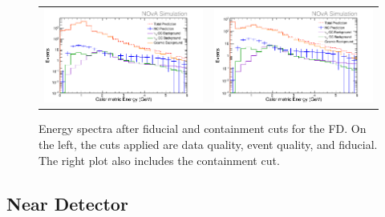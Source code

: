 \begin{figure}[htb]
  \centering
  \begin{tabular}{c c}
    \includegraphics[width=.47\textwidth]{figures/RecoE2FD.png} &
    \includegraphics[width=.47\textwidth]{figures/RecoE3FD.png} \\
  \end{tabular}
  \caption[Energy Spectra After Fiducial and Containment Cuts, FD]{Energy spectra after fiducial and containment cuts for the FD. On the left, the cuts applied are data quality, event quality, and fiducial. The right plot also includes the containment cut.}
  \label{fig:NP1FidContFD}
\end{figure}

\subsection{Near Detector}

